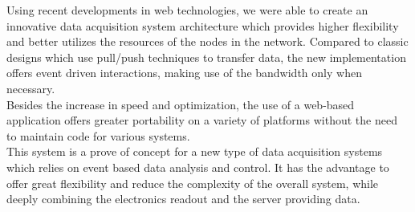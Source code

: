     Using recent developments in web technologies, we were able to create an innovative data acquisition system architecture which provides higher flexibility and better utilizes the resources of the nodes in the network. Compared to classic designs which use pull/push techniques to transfer data, the new implementation offers event driven interactions, making use of the bandwidth only when necessary. \\

    Besides the increase in speed and optimization, the use of a web-based application offers greater portability on a variety of platforms without the need to maintain code for various systems. \\

    This system is a prove of concept for a new type of data acquisition systems which relies on event based data analysis and control. It has the advantage to offer great flexibility and reduce the complexity of the overall system, while deeply combining the electronics readout and the server providing data.
